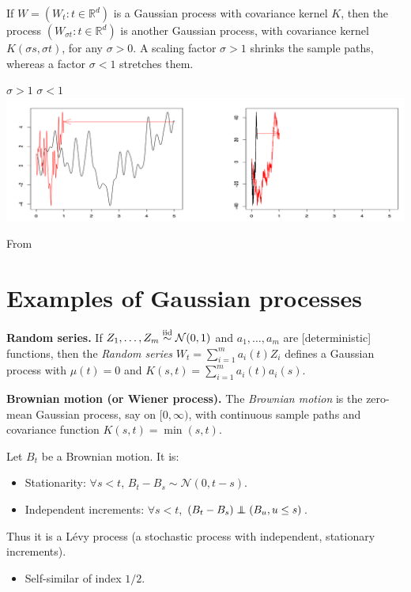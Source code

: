 If $W =(W_t: t \in \mathbb{R}^d)$ is a Gaussian process  with covariance kernel $K$, then the process $(W_{\sigma t}: t \in \mathbb{R}^d)$ is another Gaussian process, with covariance kernel $K(\sigma s, \sigma t)$, for any $\sigma  > 0$. A scaling factor $\sigma  > 1$ shrinks the sample paths, whereas a factor $\sigma  < 1$ stretches them.

\begin{center}
	$\sigma  > 1$ \hspace{4.5cm} $\sigma  < 1$ 
	\includegraphics[width=.9\textwidth]{figures_julyan/gp/scaling}
\end{center}
\hfill From \citet{ghosal2017fundamentals}

\section{Examples of Gaussian processes}


\begin{example}\textbf{Random series.}
	If $Z_1,\ldots,Z_m\stackrel{\mbox{\scriptsize{iid}}}{\sim} \mathcal{N}(0,1)$ and $a_1,\ldots,a_m$ are [deterministic] functions, then the \textit{Random series} $W_t = \sum_{i=1}^m a_i(t)Z_i$ defines a Gaussian process with $\mu(t)=0$ and $K(s, t)= \sum_{i=1}^m a_i(t)a_i(s)$.
\end{example}






\begin{exampleT}\textbf{Brownian motion (or Wiener process).}
	The \textit{Brownian motion} is the zero-mean Gaussian process, say on $[0,\infty)$, with continuous sample paths and covariance function $K(s,t)=\min(s,t)$.
\end{exampleT}



	Let $B_t$ be a Brownian motion. It is:
	\begin{itemize}
		\item \alert{Stationarity}:  $\forall s< t$, $B_t-B_s\sim \mathcal{N}(0,t-s)$.
		\item \alert{Independent increments}:  $\forall s< t$, $(B_t-B_s)\perp\!\!\!\!\perp (B_u, u\leq s)$.
	\end{itemize}
	Thus it is a L\'evy process (a stochastic process with independent, stationary increments).
	\begin{itemize}
		\item \alert{Self-similar} of index $1/2$.
	\end{itemize}






